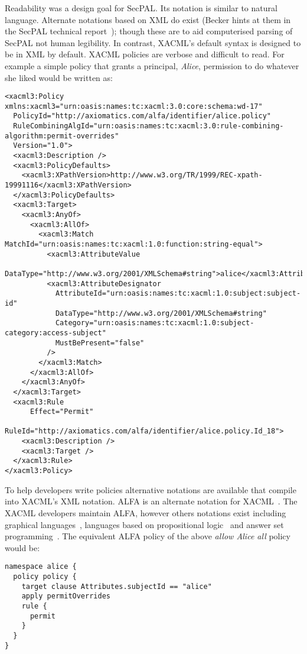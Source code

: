 \documentclass[thesis.tex]{subfiles}
\begin{document}
Readability was a design goal for SecPAL. Its notation is similar to natural
language. Alternate notations based on XML do exist (Becker hints at them in the
SecPAL technical report~\cite{becker_secpal:_2006}); though these are to aid
computerised parsing of SecPAL not human legibility. In contrast, XACML's
default syntax is designed to be in XML by default. XACML policies are verbose and difficult to read.
For example a simple policy that grants a principal, \emph{Alice}, permission to do whatever she liked would be written as:

\begin{lstlisting}
<xacml3:Policy xmlns:xacml3="urn:oasis:names:tc:xacml:3.0:core:schema:wd-17"
  PolicyId="http://axiomatics.com/alfa/identifier/alice.policy"
  RuleCombiningAlgId="urn:oasis:names:tc:xacml:3.0:rule-combining-algorithm:permit-overrides"
  Version="1.0">
  <xacml3:Description />
  <xacml3:PolicyDefaults>
    <xacml3:XPathVersion>http://www.w3.org/TR/1999/REC-xpath-19991116</xacml3:XPathVersion>
  </xacml3:PolicyDefaults>
  <xacml3:Target>
    <xacml3:AnyOf>
      <xacml3:AllOf>
        <xacml3:Match MatchId="urn:oasis:names:tc:xacml:1.0:function:string-equal">
          <xacml3:AttributeValue
            DataType="http://www.w3.org/2001/XMLSchema#string">alice</xacml3:AttributeValue>
          <xacml3:AttributeDesignator 
            AttributeId="urn:oasis:names:tc:xacml:1.0:subject:subject-id"
            DataType="http://www.w3.org/2001/XMLSchema#string"
            Category="urn:oasis:names:tc:xacml:1.0:subject-category:access-subject"
            MustBePresent="false"
          />
        </xacml3:Match>
      </xacml3:AllOf>
    </xacml3:AnyOf>
  </xacml3:Target>
  <xacml3:Rule 
      Effect="Permit"
      RuleId="http://axiomatics.com/alfa/identifier/alice.policy.Id_18">
    <xacml3:Description />
    <xacml3:Target />
  </xacml3:Rule>
</xacml3:Policy>
\end{lstlisting}

To help developers write policies alternative notations are available that
compile into XACML's XML notation. ALFA is an alternate notation for
XACML~\cite{oasis_xacml_technical_comitee_abbreviated_2015}. The XACML
developers maintain ALFA, however others notations exist including graphical
languages~\cite{henrik_nergaard_scratch-based_2015}, languages based on
propositional logic~\cite{zhang_synthesising_2004} and answer set
programming~\cite{ramli_xacml_2012}.  The equivalent ALFA policy of the above \emph{allow Alice all} policy would be:

\begin{lstlisting}
namespace alice {
  policy policy {
    target clause Attributes.subjectId == "alice"
    apply permitOverrides
    rule {
      permit
    }
  }
}
\end{lstlisting}
\end{document}
